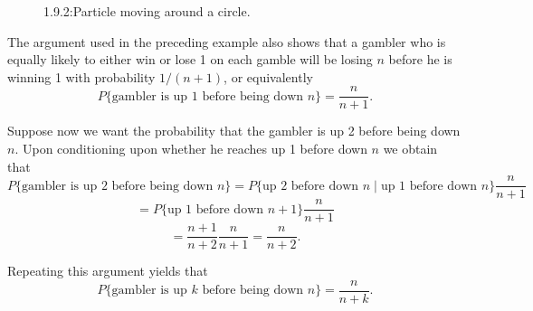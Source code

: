 \documentclass[lang=cn,10pt]{elegantbook}
\begin{document}
\begin{solution}
\begin{figure}[htbp]
	\caption{1.9.2:Particle moving around a circle.}
	\label{fig:1.9.2}
	\end{figure}
\end{solution}
\begin{remark}
The argument used in the preceding example also shows that a gambler who is equally likely to either win or lose 1 on each gamble will be losing $n$ before he is winning 1 with probability $1/(n + 1)$, or equivalently
\[
P\{\text{gambler is up 1 before being down } n\} = \frac{n}{n + 1}.
\]

Suppose now we want the probability that the gambler is up 2 before being down $n$. Upon conditioning upon whether he reaches up 1 before down $n$ we obtain that
\[
P\{\text{gambler is up 2 before being down } n\} = P\{\text{up 2 before down } n \mid \text{up 1 before down } n\} \frac{n}{n + 1}
\]
\[
= P\{\text{up 1 before down } n + 1\} \frac{n}{n + 1}
\]
\[
= \frac{n + 1}{n + 2} \frac{n}{n + 1} = \frac{n}{n + 2}.
\]

Repeating this argument yields that
\[
P\{\text{gambler is up } k \text{ before being down } n\} = \frac{n}{n + k}.
\]
\end{remark}
\end{document}
